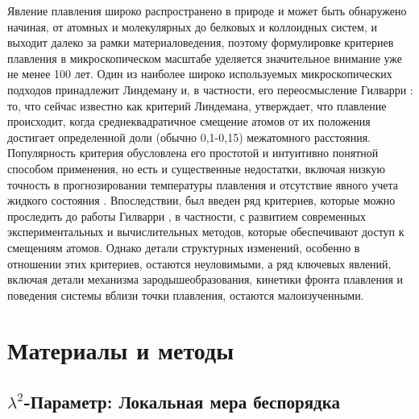 Явление плавления широко распространено в природе и может быть обнаружено начиная, от атомных и молекулярных до белковых и коллоидных систем, и выходит далеко за рамки материаловедения, поэтому формулировке критериев плавления в микроскопическом масштабе уделяется значительное внимание уже не менее 100 лет.
Один из наиболее широко используемых микроскопических подходов принадлежит Линдеману \cite{lindemann1910} и, в частности, его переосмысление Гилварри \cite{10.1103/physrev.102.308}: то, что сейчас известно как критерий Линдемана, утверждает, что плавление происходит, когда среднеквадратичное смещение атомов от их положения достигает определенной доли (обычно 0,1-0,15) межатомного расстояния.
Популярность критерия обусловлена его простотой и интуитивно понятной способом применения, но есть и существенные недостатки, включая низкую точность в прогнозировании температуры плавления и отсутствие явного учета жидкого состояния \cite{10.1098/rspa.1991.0068}.
Впоследствии, был введен ряд критериев, которые можно проследить до работы Гилварри \cite{10.1063/1.1426419}, в частности, с развитием современных экспериментальных и вычислительных методов, которые обеспечивают доступ к смещениям атомов.
Однако детали структурных изменений, особенно в отношении этих критериев, остаются неуловимыми, а ряд ключевых явлений, включая детали механизма зародышеобразования, кинетики фронта плавления и поведения системы вблизи точки плавления, остаются малоизученными.


\section{Материалы и методы}

\subsection{$\lambda^2$-Параметр: Локальная мера беспорядка}
\label{SSMF-AppA}

